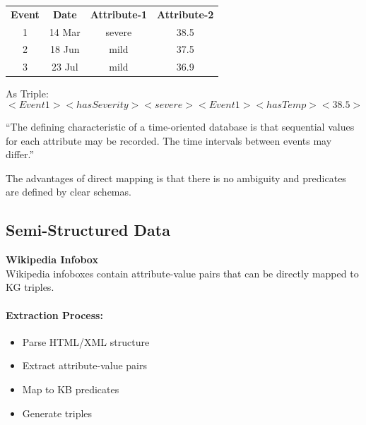 \begin{bsp}
    \begin{mytable}
        \begin{tabular}{cccc}
            \textbf{Event} & \textbf{Date} & \textbf{Attribute-1} & \textbf{Attribute-2} \\
            1              & 14 Mar        & severe               & 38.5                 \\
            2              & 18 Jun        & mild                 & 37.5                 \\
            3              & 23 Jul        & mild                 & 36.9                 \\

        \end{tabular}
        \caption{Time-Oriented Database Example.}
        \label{tab:event_attributes}
    \end{mytable}
    As Triple:
    \[
        <Event1> <hasSeverity> <severe>
        <Event1> <hasTemp> <38.5>
    \]
\end{bsp}

``The defining
characteristic of a time-oriented database is that
sequential values for each attribute may be
recorded. The time intervals between events
may differ.''

The advantages of direct mapping is that there is no ambiguity and predicates are defined by clear schemas.

\subsection*{Semi-Structured Data}
\begin{bsp}
    \textbf{Wikipedia Infobox} \\
    Wikipedia infoboxes contain attribute-value pairs that can be directly mapped to KG
    triples.
\end{bsp}

\paragraph{Extraction Process:}
\begin{itemize}
    \item Parse HTML/XML structure
    \item Extract attribute-value pairs
    \item Map to KB predicates
    \item Generate triples
\end{itemize}

